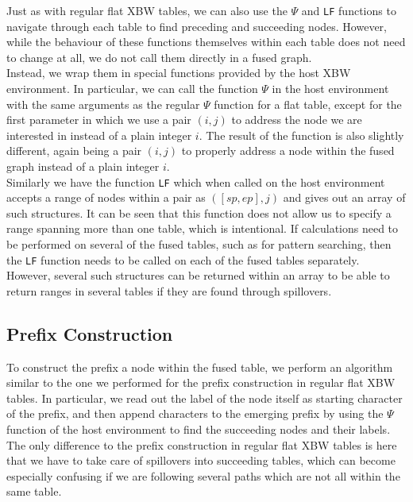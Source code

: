 \documentclass[a4paper,12pt,twoside,BCOR=10mm]{scrbook}
\begin{document}
Just as with regular flat XBW tables, we can also use the $ \Psi $ and \texttt{LF} functions 
to navigate through each table to find preceding and succeeding nodes. 
However, while the behaviour of these functions themselves within each table does not need to change 
at all, we do not call them directly in a fused graph. \\
Instead, we wrap them in special functions provided by the host XBW environment. 
In particular, we can call the function $\Psi$ in the host environment with the same arguments 
as the regular $ \Psi $ function for a flat table, except for the first parameter 
in which we use a pair $ (i, j) $ to address the node 
we are interested in instead of a plain integer $ i $. 
The result of the function is also slightly different, again being a pair $ (i, j) $ to 
properly address a node within the fused graph instead of a plain integer $ i $. \\
Similarly we have the function \texttt{LF} which when called on the host environment accepts a range of nodes 
within a pair as $ ([sp, ep], j) $ and gives out an array of such structures. 
It can be seen that this function does not allow us to specify a range spanning more 
than one table, which is intentional. If calculations need to be performed on 
several of the fused tables, such as for pattern searching, then the \texttt{LF} function 
needs to be called on each of the fused tables separately. 
However, several such structures can be returned within an array to be able to return 
ranges in several tables if they are found through spillovers.


\subsection{Prefix Construction}

To construct the prefix a node within the fused table, 
we perform an algorithm similar to the one we performed for the prefix construction 
in regular flat XBW tables. 
In particular, we read out the label of the node itself as starting character of the prefix, 
and then append characters to the emerging prefix by using the $\Psi$ function of the host environment to 
find the succeeding nodes and their labels. 
The only difference to the prefix construction in regular flat XBW tables 
is here that we have to take care of spillovers into succeeding tables, 
which can become especially confusing if we are following several paths which are not all 
within the same table.
\end{document}
